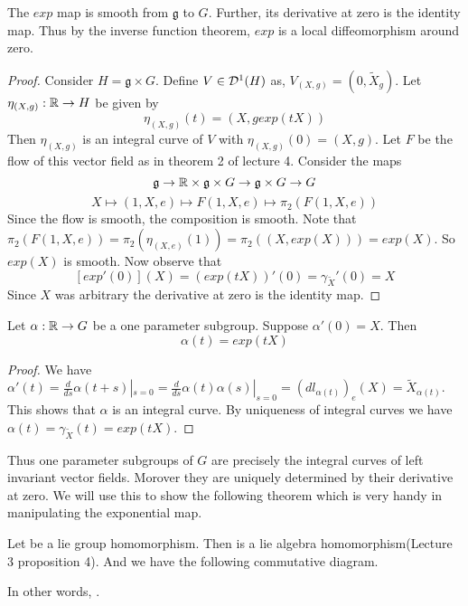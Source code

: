\documentclass{article}
\begin{document}
\begin{proposition}
    The $exp$ map is smooth from $\mathfrak{g}$ to $G$. Further, its derivative at zero is the identity map.
    Thus by the inverse function theorem, $exp$ is a local diffeomorphism around zero.
\end{proposition}

\begin{proof}
    Consider $H = \mathfrak{g}\times G$. Define $V\in \mathcal{D}^1(H)$ as, $V_{(X,g)} = (0,\tilde{X}_g)$. Let $\eta_{(X,g)}:\mathbb R\to H$ be given by 
    $$\eta_{(X,g)}(t) = (X,gexp(tX))$$
    Then $\eta_{(X,g)}$ is an integral curve of $V$ with $\eta_{(X,g)}(0) = (X,g)$. Let $F$ be the flow of this vector field as in theorem 2 of lecture 4. Consider the maps
    $$\mathfrak{g}\to \mathbb R\times \mathfrak{g}\times G\to \mathfrak{g}\times G\to G$$
    $$X\mapsto (1,X,e)\mapsto F(1,X,e)\mapsto \pi_2(F(1,X,e))$$
    Since the flow is smooth, the composition is smooth. Note that $\pi_2(F(1,X,e)) = \pi_2(\eta_{(X,e)}(1)) = \pi_2((X,exp(X))) = exp(X) $. So $exp(X)$ is smooth.
    Now observe that $$[exp'(0)](X) = (exp(tX))'(0) = \gamma_{\tilde{X}}'(0) = X$$
    Since $X$ was arbitrary the derivative at zero is the identity map.
\end{proof}

\begin{lemma}
    Let $\alpha:\mathbb R\to G$ be a one parameter subgroup. Suppose $\alpha'(0) = X$. Then $$\alpha(t) = exp(tX)$$
\end{lemma}
\begin{proof}
    We have $\alpha'(t) = \frac{d}{ds}\alpha(t+s)|_{s=0} = \frac{d}{ds}\alpha(t)\alpha(s)|_{s=0} = (dl_{\alpha(t)})_e(X) = \tilde{X}_{\alpha(t)}$. This shows that $\alpha$ is an integral curve. By uniqueness of integral curves we have $\alpha(t) = \gamma_{\tilde{X}}(t) = exp(tX)$.
\end{proof}

Thus one parameter subgroups of $G$ are precisely the integral curves of left invariant vector fields. Morover they are uniquely determined by their derivative at zero.
We will use this to show the following theorem which is very handy in manipulating the exponential map.

\begin{theorem}
    Let  be a lie group homomorphism. Then  is a lie algebra homomorphism(Lecture 3 proposition 4).
    And we have the following commutative diagram.
    \begin{center}
    \end{center}
    In other words, .
\end{theorem}
\end{document}
